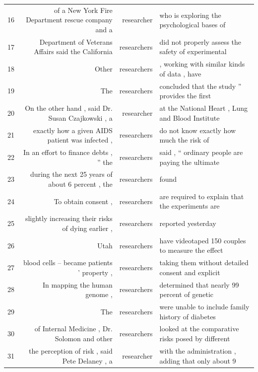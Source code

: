 {\begin{table}
\begin{tabular}{lrrl}
16 & of a New York Fire Department rescue company and a & researcher  & who is exploring the psychological bases of        \\
17 & Department of Veterans Affairs said the California & researchers & did not properly assess the safety of experimental \\
18 & Other                                              & researchers & , working with similar kinds of data , have        \\
19 & The                                                & researchers & concluded that the study '' provides the first     \\
20 & On the other hand , said Dr. Susan Czajkowski , a  & researcher  & at the National Heart , Lung and Blood Institute   \\
21 & exactly how a given AIDS patient was infected ,    & researchers & do not know exactly how much the risk of           \\
22 & In an effort to finance debts , '' the             & researchers & said , `` ordinary people are paying the ultimate  \\
23 & during the next 25 years of about 6 percent , the  & researchers & found                                              \\
24 & To obtain consent ,                                & researchers & are required to explain that the experiments are   \\
25 & slightly increasing their risks of dying earlier , & researchers & reported yesterday                                 \\
26 & Utah                                               & researchers & have videotaped 150 couples to measure the effect  \\
27 & blood cells -- became patients ' property ,        & researchers & taking them without detailed consent and explicit  \\
28 & In mapping the human genome ,                      & researchers & determined that nearly 99 percent of genetic       \\
29 & The                                                & researchers & were unable to include family history of diabetes  \\
30 & of Internal Medicine , Dr. Solomon and other       & researchers & looked at the comparative risks posed by different \\
31 & the perception of risk , said Pete Delaney , a     & researcher  & with the administration , adding that only about 9 \\

\end{tabular}
\end{table}}
